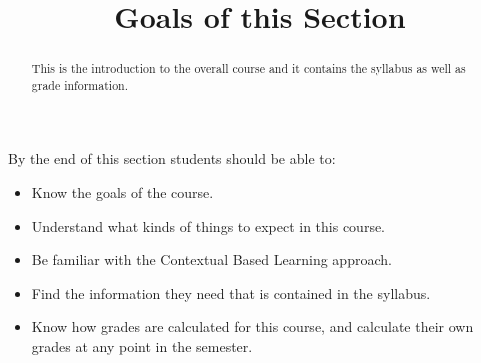 \documentclass{ximeraXloud}
\title{Goals of this Section}
\begin{document}
\begin{abstract}
This is the introduction to the overall course and it contains the syllabus as well as grade information.
\end{abstract}
\maketitle
By the end of this section students should be able to:

\begin{itemize}
    \item Know the goals of the course.
    \item Understand what kinds of things to expect in this course.
    \item Be familiar with the Contextual Based Learning approach.
    \item Find the information they need that is contained in the syllabus.
    \item Know how grades are calculated for this course, and calculate their own grades at any point in the semester.
\end{itemize}
\end{document}
